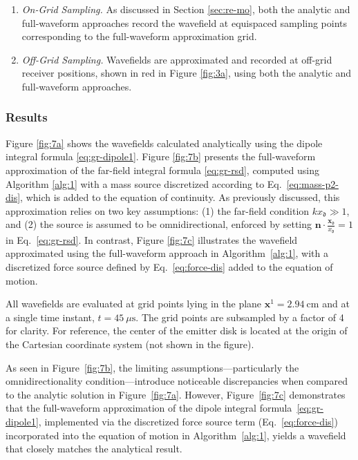 \documentclass[11pt,reqno]{amsart}
\theoremstyle{remark}
\theoremstyle{italic_lemma}
\newcommand{\bx}{\boldsymbol{x}}
\newcommand{\bn}{\boldsymbol{n}}
\newcommand{\fd}{\mathfrak{d}}
\begin{document}
\begin{enumerate}

\item \emph{On-Grid Sampling.}  
As discussed in Section \ref{sec:re-mo}, both the analytic and full-waveform approaches record the wavefield at equispaced sampling points corresponding to the full-waveform approximation grid.

\item \emph{Off-Grid Sampling.}  
Wavefields are approximated and recorded at off-grid receiver positions, shown in red in Figure \ref{fig:3a}, using both the analytic and full-waveform approaches.

\end{enumerate}

\subsubsection{Results}

Figure \ref{fig:7a} shows the wavefields calculated analytically using the dipole integral formula \eqref{eq:gr-dipole1}. Figure \ref{fig:7b} presents the full-waveform approximation of the far-field integral formula \eqref{eq:gr-rsd}, computed using Algorithm \ref{alg:1} with a mass source discretized according to Eq.~\eqref{eq:mass-p2-dis}, which is added to the equation of continuity. As previously discussed, this approximation relies on two key assumptions: (1) the far-field condition \( k x_{\fd} \gg 1 \), and (2) the source is assumed to be omnidirectional, enforced by setting \(\bn \cdot \frac{\bx_{\fd}}{x_{\fd}} = 1\) in Eq.~\eqref{eq:gr-rsd}. In contrast, Figure \ref{fig:7c} illustrates the wavefield approximated using the full-waveform approach in Algorithm~\ref{alg:1}, with a discretized force source defined by Eq.~\eqref{eq:force-dis} added to the equation of motion.

All wavefields are evaluated at grid points lying in the plane \(\bx^1 = 2.94~\text{cm}\) and at a single time instant, \(t = 45~\mu\text{s}\). The grid points are subsampled by a factor of 4 for clarity. For reference, the center of the emitter disk is located at the origin of the Cartesian coordinate system (not shown in the figure).

As seen in Figure~\ref{fig:7b}, the limiting assumptions—particularly the omnidirectionality condition—introduce noticeable discrepancies when compared to the analytic solution in Figure~\ref{fig:7a}. However, Figure~\ref{fig:7c} demonstrates that the full-waveform approximation of the dipole integral formula~\eqref{eq:gr-dipole1}, implemented via the discretized force source term (Eq.~\eqref{eq:force-dis}) incorporated into the equation of motion in Algorithm~\ref{alg:1}, yields a wavefield that closely matches the analytical result.
\end{document}
